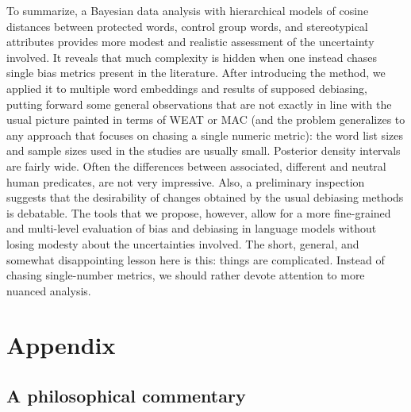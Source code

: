 \documentclass{clv3}
\begin{document}
To summarize, a Bayesian data analysis with hierarchical models of
cosine distances between protected words, control group words, and
stereotypical attributes provides more modest and realistic assessment
of the uncertainty involved. It reveals that much complexity is hidden
when one instead chases single bias metrics present in the literature. After introducing the method, we applied it to multiple word embeddings
and results of supposed debiasing, putting forward some general
observations that are not exactly in line with the usual picture painted
in terms of \textsf{WEAT} or \textsf{MAC} (and the problem generalizes
to any approach that focuses on chasing a single numeric metric): the
word list sizes and sample sizes used in the studies are usually small.
Posterior density intervals are fairly wide. Often the differences
between associated, different and neutral human predicates, are not very
impressive. Also, a preliminary inspection suggests that the
desirability of changes obtained by the usual debiasing methods is
debatable. The tools that we propose, however, allow for a more
fine-grained and multi-level evaluation of bias and debiasing in
language models without losing modesty about the uncertainties involved. The short, general, and somewhat disappointing lesson here is this: things
are complicated. Instead of chasing single-number metrics, we should
rather devote attention to more nuanced analysis.
































\appendix

\hypertarget{appendix}{%
\section{Appendix}\label{appendix}}

\label{sec:appendix}


\hypertarget{philosophical}{%
	\subsection{A philosophical commentary}}
\end{document}

